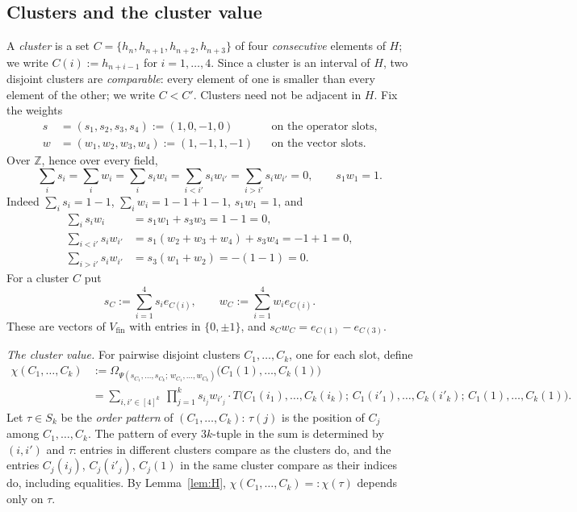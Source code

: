 \documentclass[11pt]{amsart}
\theoremstyle{definition}
\theoremstyle{remark}
\numberwithin{equation}{section}
\newcommand{\Z}{\mathbb{Z}}
\begin{document}
\subsection{Clusters and the cluster value}
A \emph{cluster} is a set $C=\{h_n,h_{n+1},h_{n+2},h_{n+3}\}$ of four
\emph{consecutive} elements of $H$; we write $C(i):=h_{n+i-1}$ for $i=1,\dots,4$. Since a cluster is an interval of
$H$, two disjoint clusters are \emph{comparable}: every element of one is smaller than every element of the other; we
write $C<C'$. Clusters need not be adjacent in $H$. Fix the weights
\begin{align*}
s&=(s_1,s_2,s_3,s_4):=(1,0,-1,0)&&\text{on the operator slots},\\
w&=(w_1,w_2,w_3,w_4):=(1,-1,1,-1)&&\text{on the vector slots}.
\end{align*}
Over $\Z$, hence over every field,
\begin{equation*}\tag{W}\label{eq:W}
\sum_is_i=\sum_iw_i=\sum_is_iw_i=\sum_{i<i'}s_iw_{i'}=\sum_{i>i'}s_iw_{i'}=0,\qquad s_1w_1=1.
\end{equation*}
Indeed $\sum_is_i=1-1$, $\sum_iw_i=1-1+1-1$, $s_1w_1=1$, and
\begin{align*}
\sum_is_iw_i&=s_1w_1+s_3w_3=1-1=0,\\
\sum_{i<i'}s_iw_{i'}&=s_1(w_2+w_3+w_4)+s_3w_4=-1+1=0,\\
\sum_{i>i'}s_iw_{i'}&=s_3(w_1+w_2)=-(1-1)=0 .
\end{align*}
For a cluster $C$ put
\[
s_C:=\sum_{i=1}^4s_ie_{C(i)},\qquad w_C:=\sum_{i=1}^4w_ie_{C(i)} .
\]
These are vectors of $V_{\mathrm{fin}}$ with entries in $\{0,\pm1\}$, and $s_Cw_C=e_{C(1)}-e_{C(3)}$.

\emph{The cluster value.} For pairwise disjoint clusters $C_1,\dots,C_k$, one for each slot, define
\begin{align*}
\chi(C_1,\dots,C_k)&:=\Omega_{\Psi(s_{C_1},\dots,s_{C_k};\,w_{C_1},\dots,w_{C_k})}\bigl(C_1(1),\dots,C_k(1)\bigr)\\
&=\sum_{i,i'\in[4]^k}\ \prod_{j=1}^ks_{i_j}w_{i'_j}\cdot
T\bigl(C_1(i_1),\dots,C_k(i_k);\,C_1(i'_1),\dots,C_k(i'_k);\,C_1(1),\dots,C_k(1)\bigr).
\end{align*}
Let $\tau\in S_k$ be the \emph{order pattern} of $(C_1,\dots,C_k)$: $\tau(j)$ is the position of $C_j$ among
$C_1,\dots,C_k$. The pattern of every $3k$\nobreakdash-tuple in the sum is determined by $(i,i')$ and $\tau$: entries in different
clusters compare as the clusters do, and the entries $C_j(i_j)$, $C_j(i'_j)$, $C_j(1)$ in the same cluster compare as
their indices do, including equalities. By Lemma~\ref{lem:H}, $\chi(C_1,\dots,C_k)=:\chi(\tau)$ depends only on $\tau$.
\end{document}
